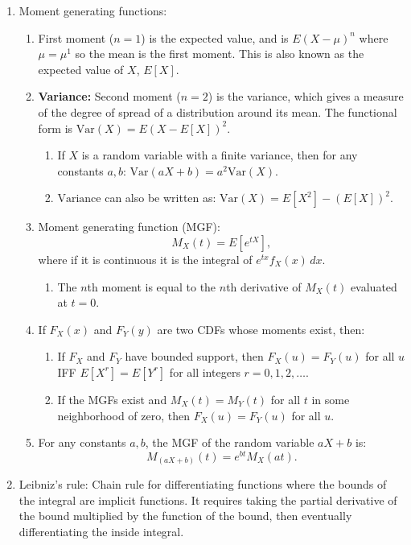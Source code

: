 \documentclass{article}
\begin{document}
\begin{enumerate}
    \item Moment generating functions:
    \begin{enumerate}
        \item First moment (\(n = 1\)) is the expected value, and is \( E(X - \mu)^n \) where \( \mu = \mu^1 \) so the mean is the first moment. This is also known as the expected value of \( X \), \( E[X] \).
        \item \textbf{Variance:} Second moment (\(n = 2\)) is the variance, which gives a measure of the degree of spread of a distribution around its mean. The functional form is \( \text{Var}(X) = E(X - E[X])^2 \).
        \begin{enumerate}
            \item If \( X \) is a random variable with a finite variance, then for any constants \( a,b \): \( \text{Var}(aX + b) = a^2 \text{Var}(X) \).
            \item \(\text{Variance}\) can also be written as: \( \text{Var}(X) = E[X^2] - (E[X])^2 \).
        \end{enumerate}
        \item Moment generating function (MGF): 
        \[
        M_X(t) = E[e^{tX}],
        \]
        where if it is continuous it is the integral of \( e^{tx} f_X(x) \, dx \).
        \begin{enumerate}
            \item The \(n\)th moment is equal to the \(n\)th derivative of \(M_X(t)\) evaluated at \(t=0\).
        \end{enumerate}
        \item If \( F_X(x) \) and \( F_Y(y) \) are two CDFs whose moments exist, then:
        \begin{enumerate}
            \item If \( F_X \) and \( F_Y \) have bounded support, then \( F_X(u) = F_Y(u) \) for all \( u \) IFF \( E[X^r] = E[Y^r] \) for all integers \( r = 0, 1, 2, \ldots \).
            \item If the MGFs exist and \( M_X(t) = M_Y(t) \) for all \( t \) in some neighborhood of zero, then \( F_X(u) = F_Y(u) \) for all \( u \).
        \end{enumerate}
        \item For any constants \( a,b \), the MGF of the random variable \( aX + b \) is:
        \[
        M_{(aX + b)}(t) = e^{bt} M_X(at).
        \]
    \end{enumerate}

    \item Leibniz's rule: Chain rule for differentiating functions where the bounds of the integral are implicit functions. It requires taking the partial derivative of the bound multiplied by the function of the bound, then eventually differentiating the inside integral.


\end{enumerate}
\end{document}
